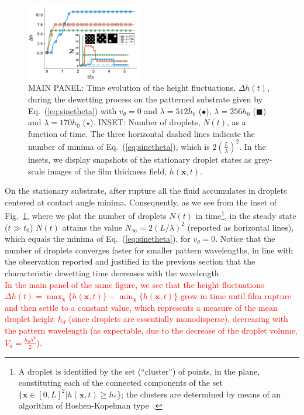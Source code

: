 \documentclass[twocolumn,amsmath,amssymb,showpacs,prl,superscriptaddress]{revtex4-1} %
\begin{document}
\begin{figure}
    \centering
    \includegraphics[width=0.45\textwidth]{Figure_3.pdf}
    \caption{MAIN PANEL: Time evolution of the height fluctuations, $\Delta h(t)$, during the dewetting process on the patterned substrate given by       
    Eq.~(\ref{eq:sinetheta})
    with $v_{\theta}= 0$ and $\lambda= 512 h_0$ (\textcolor{jlblue}{$\bullet$}), $\lambda=256 h_0$ (\textcolor{jlorange}{$\blacksquare$}) and $\lambda=170 h_0$ (\textcolor{jlgreen}{$\star$}).
    INSET: Number of droplets, $N(t)$, as a function of time. The three horizontal dashed lines indicate the number of minima of Eq.~(\ref{eq:sinetheta}),
      which is $2\left(\frac{L}{\lambda}\right)^2$. In the insets, we display snapshots of the stationary droplet states as grey-scale images
      of the film thickness field, $h(\mathbf{x},t)$.
      }
    \label{fig:clusters_v0_sine}
\end{figure}
On the stationary substrate, after rupture all the fluid accumulates in droplets centered at contact angle minima.
Consequently, as we see from the inset of Fig.~\ref{fig:clusters_v0_sine}, where we plot the number of droplets $N(t)$ in time\footnote{A droplet is identified by the set (``cluster'') of points, in the plane, constituting each of the connected components of the set $\{\mathbf{x} \in [0,L]^2 | h(\mathbf{x},t) \geq h_{\ast}$\}; the clusters are determined by means of an algorithm of Hoshen-Kopelman type~\cite{HK}.}, in the steady state ($t \gg t_0$) $N(t)$ attains the value $N_{\infty} = 2(L/\lambda)^2$ (reported as horizontal lines), which equals the minima of Eq.~(\ref{eq:sinetheta}), for $v_{\theta}=0$.
Notice that the number of droplets converges faster for smaller pattern wavelengths, in line with the observation reported and justified in the previous section that the characteristic dewetting time decreases with the wavelength.\\
\textcolor{red}{In the main panel of the same figure, we see that the height fluctuations $\Delta h(t) = \max_{\mathbf{x}}\{h(\mathbf{x},t)\}-\min_{\mathbf{x}}\{h(\mathbf{x},t)\}$
grow in time until film rupture and then settle to a constant value, which represents a measure of the mean droplet height $h_d$ (since
droplets are essentially monodisperse), decreasing with the pattern wavelength (as expectable, due to the decrease of the droplet volume,
$V_d = \frac{h_0 \lambda^2}{2}$).}\\
\end{document}
